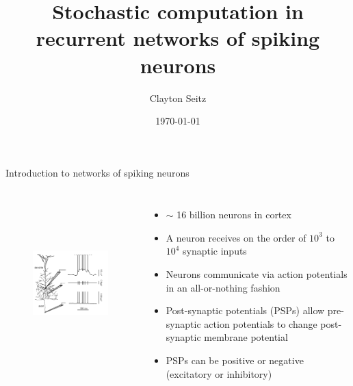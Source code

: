 \documentclass[aspectratio=169]{beamer}
\begin{document}
\title{Stochastic computation in recurrent networks of spiking neurons}  
\author{Clayton Seitz}
\date{\today} 

\maketitle

\begin{frame}{Introduction to networks of spiking neurons}

\begin{columns}
\begin{figure}
\includegraphics[height=65mm, width=75mm]{figure-18}
\end{figure}
\begin{itemize}
\item $\sim$ 16 billion neurons in cortex
\item A neuron receives on the order of $10^{3}$ to $10^{4}$ synaptic inputs
\item Neurons communicate via action potentials in an all-or-nothing fashion
\item Post-synaptic potentials (PSPs) allow pre-synaptic action potentials to change post-synaptic membrane potential
\item PSPs can be positive or negative (excitatory or inhibitory)
\end{itemize}

\end{columns} 



\end{frame}
\end{document}
